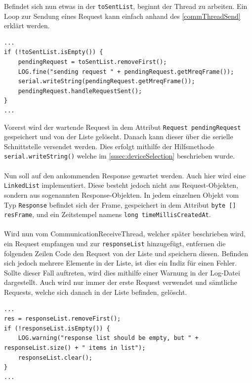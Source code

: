 Befindet sich nun etwas in der \lstinline[style=java]{toSentList}, beginnt der Thread zu arbeiten.
Ein Loop zur Sendung eines Request kann einfach anhand des \autoref{commThreadSend} erklärt werden.
\begin{lstlisting}[style=java,caption=Teilabschnitt CommunicationSendThread,label=commThreadSend]
...
if (!toSentList.isEmpty()) {
    pendingRequest = toSentList.removeFirst();
    LOG.fine("sending request " + pendingRequest.getMreqFrame());
    serial.writeString(pendingRequest.getMreqFrame());
    pendingRequest.handleRequestSent();
}
...
\end{lstlisting}
Vorerst wird der wartende Request in dem Attribut \lstinline[style=java]{Request pendingRequest} gespeichert und von der Liste gelöscht.
Danach kann dieser über die serielle Schnittstelle versendet werden.
Dies erfolgt mithilfe der Hilfsmethode \lstinline[style=java]{serial.writeString()} welche im \autoref{sssec:deviceSelection} beschrieben wurde.\\\\
Nun soll auf den ankommenden Response gewartet werden.
Auch hier wird eine \lstinline[style=java]{LinkedList} implementiert.
Diese besteht jedoch nicht aus Request-Objekten, sondern aus sogenannten Response-Objekten.
In jedem einzelnen Objekt vom Typ \lstinline[style=java]{Response} befindet sich der Frame, gespeichert in dem Attribut \lstinline[style=java]{byte [] resFrame}, und ein Zeitstempel namens \lstinline[style=java]{long timeMillisCreatedAt}.\\\\
Wird nun vom CommunicationReceiveThread, welcher später beschrieben wird, ein Request empfangen und zur \lstinline[style=java]{responseList} hinzugefügt, entfernen die folgenden Zeilen Code den Request von der Liste und speichern diesen.
Befinden sich jedoch mehrere Elemente in der Liste, ist dies ein Indiz für einen Fehler.
Sollte dieser Fall auftreten, wird dies mithilfe einer Warnung in der Log-Datei dargestellt.
Auch wird nur immer der erste Request verwendet und sämtliche Requests, welche sich danach in der Liste befinden, gelöscht.
\begin{lstlisting}[style=java,caption=Teilabschnitt CommunicationSendThread,label=commThreadSend]
...
res = responseList.removeFirst();
if (!responseList.isEmpty()) {
    LOG.warning("response list should be empty, but " + responseList.size() + " items in list");
    responseList.clear();
}
...
\end{lstlisting}
